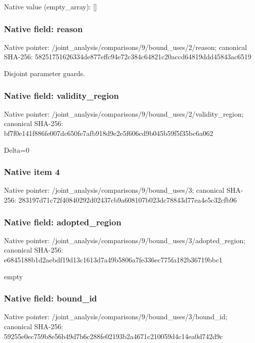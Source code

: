 \documentclass[10pt,a4paper]{article}
\begin{document}
Native value (empty\_\allowbreak{}array): []

\subsubsection{Native field: reason}
Native pointer: /joint\_\allowbreak{}analysis/comparisons/9/bound\_\allowbreak{}uses/2/reason; canonical SHA-256: 58251751626334de877effc94e72c384c64821c20accd64819ddd45843ac6519

\begingroup\raggedright\sloppy Disjoint parameter guards.\par\endgroup

\subsubsection{Native field: validity\_\allowbreak{}region}
Native pointer: /joint\_\allowbreak{}analysis/comparisons/9/bound\_\allowbreak{}uses/2/validity\_\allowbreak{}region; canonical SHA-256: bf7f0e141f886fe007dc650fe7afb918d9e2e5f606cd9b045b59f5f35bc6a062

\begingroup\raggedright\sloppy Delta=\allowbreak{}0\par\endgroup

\subsubsection{Native item 4}
Native pointer: /joint\_\allowbreak{}analysis/comparisons/9/bound\_\allowbreak{}uses/3; canonical SHA-256: 283197d71c72f40840292d02437cb9a608107b023dc78843d77ea4e5c32cfb96

\subsubsection{Native field: adopted\_\allowbreak{}region}
Native pointer: /joint\_\allowbreak{}analysis/comparisons/9/bound\_\allowbreak{}uses/3/adopted\_\allowbreak{}region; canonical SHA-256: e6845188b1d2aebdf19d13c1613d7a49b5806a7fe336ec775fa182b36719bbc1

\begingroup\raggedright\sloppy empty\par\endgroup

\subsubsection{Native field: bound\_\allowbreak{}id}
Native pointer: /joint\_\allowbreak{}analysis/comparisons/9/bound\_\allowbreak{}uses/3/bound\_\allowbreak{}id; canonical SHA-256: 59255e0ec759b8e56b49d7b6c288fe02193b2a4671c210059d4c14ea0d742d9c
\end{document}
